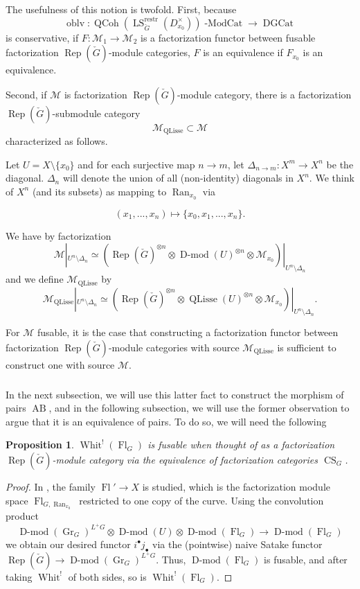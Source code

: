 \documentclass[10pt]{amsart}
\newtheorem{prop}[subsubsection]{Proposition}
\theoremstyle{remark}
\newcommand{\on}[1]{\operatorname{#1}}
\newcommand{\Dmod}{\on{D-mod}}
\newcommand{\QCoh}{\on{QCoh}}
\newcommand{\Gcheck}{\check{G}}
\newcommand{\Ran}{\on{Ran}}
\newcommand{\sssec}[1]{\subsubsection{}}
\begin{document}
\sssec{} \label{useful fusable}
The usefulness of this notion is twofold. First, because
$$
\on{oblv} : \QCoh(\on{LS}_{\Gcheck}^{\on{restr}}(D_{x_0}^{\times}))\on{-ModCat} \longrightarrow \on{DGCat}
$$
is conservative, if $F : \mathcal{M}_1 \longrightarrow \mathcal{M}_2$ is a factorization functor between fusable factorization $\on{Rep}(\Gcheck)$-module categories, $F$ is an equivalence if $F_{x_0}$ is an equivalence.

Second, if $\mathcal{M}$ is factorization $\on{Rep}(\Gcheck)$-module category, there is a factorization $\on{Rep}(\Gcheck)$-submodule category
$$
\mathcal{M}_{\on{QLisse}} \subset \mathcal{M}
$$
characterized as follows.

Let $U = X \setminus \{x_0\}$ and for each surjective map $n \to m$, let $\Delta_{n \to m} : X^m \longrightarrow X^n$ be the diagonal. $\Delta_n$ will denote the union of all (non-identity) diagonals in $X^n$. We think of $X^n$ (and its subsets) as mapping to $\Ran_{x_0}$ via

$$
(x_1, ..., x_n) \mapsto \{x_0, x_1, ..., x_n\}.
$$

We have by factorization
$$
\mathcal{M}|_{U^n \setminus \Delta_n} \simeq (\on{Rep}(\Gcheck)^{\otimes n} \otimes \Dmod(U)^{\otimes n} \otimes \mathcal{M}_{x_0})|_{U^n \setminus \Delta_n}
$$
and we define $\mathcal{M}_{\on{QLisse}}$ by
$$
\mathcal{M}_{\on{QLisse}}|_{U^n \setminus \Delta_n} \simeq (\on{Rep}(\Gcheck)^{\otimes n} \otimes \on{QLisse}(U)^{\otimes n} \otimes \mathcal{M}_{x_0})|_{U^n \setminus \Delta_n}.
$$

For $\mathcal{M}$ fusable, it is the case that constructing a factorization functor between factorization $\on{Rep}(\Gcheck)$-module categories with source $\mathcal{M}_{\on{QLisse}}$ is sufficient to construct one with source $\mathcal{M}$.

\sssec{}
In the next subsection, we will use this latter fact to construct the morphism of pairs $\on{AB}$, and in the following subsection, we will use the former observation to argue that it is an equivalence of pairs. To do so, we will need the following

\begin{prop}
    $\on{Whit}^!(\on{Fl}_G)$ is fusable when thought of as a factorization $\on{Rep}(\Gcheck)$-module category via the equivalence of factorization categories $\on{CS}_G$.
\end{prop}
\begin{proof}
    In \cite{Braiding}, the family $\on{Fl}' \to X$ is studied, which is the factorization module space $\on{Fl}_{G, \Ran_{x_0}}$ restricted to one copy of the curve. Using the convolution product
    $$
    \Dmod(\on{Gr}_G)^{L^+G} \otimes \Dmod(U) \otimes \Dmod(\on{Fl}_G) \longrightarrow \Dmod(\on{Fl}_G)
    $$
    we obtain our desired functor $i^{\bullet}j_{\bullet}$ via the (pointwise) naive Satake functor $\on{Rep}(\Gcheck) \to \Dmod(\on{Gr}_G)^{L^+G}$. Thus, $\Dmod(\on{Fl}_G)$ is fusable, and after taking $\on{Whit}^!$ of both sides, so is $\on{Whit}^!(\on{Fl}_G)$.
\end{proof}
\end{document}
